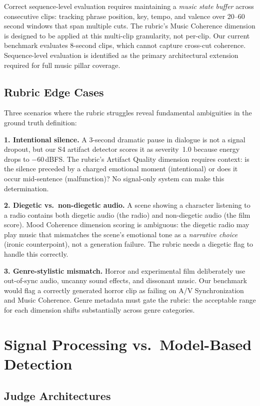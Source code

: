 \documentclass[11pt]{article}
\begin{document}
Correct sequence-level evaluation requires maintaining a \emph{music state buffer} across
consecutive clips: tracking phrase position, key, tempo, and valence over 20--60 second
windows that span multiple cuts. The rubric's Music Coherence dimension is designed to be
applied at this multi-clip granularity, not per-clip. Our current benchmark evaluates
8-second clips, which cannot capture cross-cut coherence. Sequence-level evaluation is
identified as the primary architectural extension required for full music pillar coverage.

\subsection{Rubric Edge Cases}

Three scenarios where the rubric struggles reveal fundamental ambiguities in the ground
truth definition:

\textbf{1. Intentional silence.} A 3-second dramatic pause in dialogue is not a signal
dropout, but our S4 artifact detector scores it as severity~1.0 because energy drops to
$-$60\,dBFS. The rubric's Artifact Quality dimension requires context: is the silence
preceded by a charged emotional moment (intentional) or does it occur mid-sentence
(malfunction)? No signal-only system can make this determination.

\textbf{2. Diegetic vs.\ non-diegetic audio.} A scene showing a character listening to a
radio contains both diegetic audio (the radio) and non-diegetic audio (the film score).
Mood Coherence dimension scoring is ambiguous: the diegetic radio may play music that
mismatches the scene's emotional tone as a \emph{narrative choice} (ironic counterpoint),
not a generation failure. The rubric needs a diegetic flag to handle this correctly.

\textbf{3. Genre-stylistic mismatch.} Horror and experimental film deliberately use
out-of-sync audio, uncanny sound effects, and dissonant music. Our benchmark would flag
a correctly generated horror clip as failing on A/V Synchronization and Music Coherence.
Genre metadata must gate the rubric: the acceptable range for each dimension shifts
substantially across genre categories.

\section{Signal Processing vs.\ Model-Based Detection}

\subsection{Judge Architectures}
\end{document}
